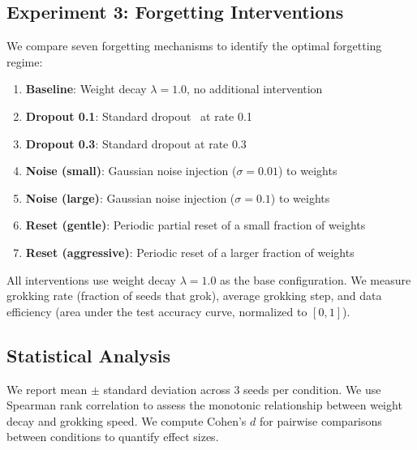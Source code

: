 \subsection{Experiment 3: Forgetting Interventions}
\label{sec:exp3}

We compare seven forgetting mechanisms to identify the optimal forgetting regime:
\begin{enumerate}[leftmargin=*,itemsep=0pt,topsep=0pt]
    \item \textbf{Baseline}: Weight decay $\lambda = 1.0$, no additional intervention
    \item \textbf{Dropout 0.1}: Standard dropout~\cite{srivastava2014dropout} at rate 0.1
    \item \textbf{Dropout 0.3}: Standard dropout at rate 0.3
    \item \textbf{Noise (small)}: Gaussian noise injection ($\sigma = 0.01$) to weights
    \item \textbf{Noise (large)}: Gaussian noise injection ($\sigma = 0.1$) to weights
    \item \textbf{Reset (gentle)}: Periodic partial reset of a small fraction of weights
    \item \textbf{Reset (aggressive)}: Periodic reset of a larger fraction of weights
\end{enumerate}
All interventions use weight decay $\lambda = 1.0$ as the base configuration. We measure grokking rate (fraction of seeds that grok), average grokking step, and data efficiency (area under the test accuracy curve, normalized to $[0, 1]$).

\subsection{Statistical Analysis}

We report mean $\pm$ standard deviation across 3 seeds per condition. We use Spearman rank correlation to assess the monotonic relationship between weight decay and grokking speed. We compute Cohen's $d$ for pairwise comparisons between conditions to quantify effect sizes.
